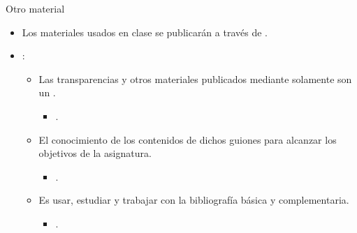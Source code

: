 \begin{frame}[t]{Otro material}
\begin{itemize}
  \item Los materiales usados en clase se publicarán a través de .

  \item {}:
    \begin{itemize}
      \item Las transparencias y otros materiales publicados mediante  solamente son un .
        \begin{itemize}
          \item {}.
        \end{itemize}
      \item El conocimiento de los contenidos de dichos guiones 
             para alcanzar los objetivos de la asignatura.
        \begin{itemize}
          \item {}.
        \end{itemize}
      \item Es  usar, estudiar y trabajar con la bibliografía básica y complementaria.
        \begin{itemize}
          \item {}.
        \end{itemize}
    \end{itemize}
\end{itemize}
\end{frame}
